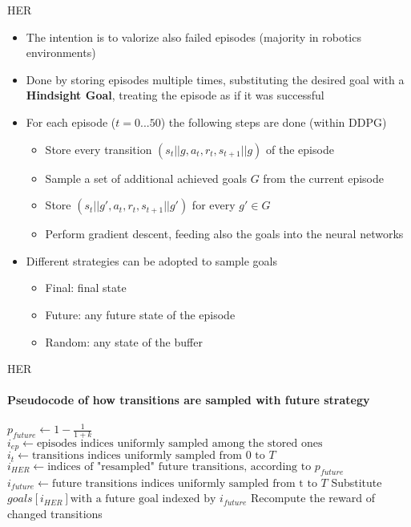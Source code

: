 \documentclass{beamer}
\begin{document}
      \begin{frame}[fragile]{HER}
            \begin{itemize}
                  \item The intention is to valorize also failed episodes (majority in robotics environments)
                  \item Done by storing episodes multiple times, substituting the desired goal with a \textbf{Hindsight Goal}, treating the episode as if it was successful
                  \item For each episode ($t = 0 ... 50$) the following steps are done (within DDPG)
                        \begin{itemize}
                              \item Store every transition $\left( s_t||g, a_t, r_t, s_{t+1}||g\right)$ of the episode
                              \item Sample a set of additional achieved goals $G$ from the current episode
                              \item Store $\left( s_t||g', a_t, r_t, s_{t+1}||g'\right)$ for every $g' \in G$
                              \item Perform gradient descent, feeding also the goals into the neural networks
                        \end{itemize}
                  \item Different strategies can be adopted to sample goals
                        \begin{itemize}
                              \item Final: final state
                              \item Future: any future state of the episode
                              \item Random: any state of the buffer
                        \end{itemize}
            \end{itemize}
      \end{frame}

      \begin{frame}[fragile]{HER}
      \framesubtitle{Pseudocode of how transitions are sampled with future strategy}
            \begin{algorithmic}[1]
                  \State $p_{future} \gets 1-\frac{1}{1+k}$  
                  \State $i_{ep} \gets \text{episodes indices uniformly sampled among the stored ones}$
                  \State $i_{t} \gets \text{transitions indices uniformly sampled from 0 to } T$
                  \State $i_{HER} \gets \text{indices of "resampled" future transitions, according to } p_{future}$
                  \State $i_{future} \gets \text{future transitions indices uniformly sampled from t to } T$
                  \State Substitute $goals[i_{HER}] \text{with a future goal indexed by } i_{future}$
                  \State Recompute the reward of changed transitions
            \end{algorithmic}
      \end{frame}
\end{document}
